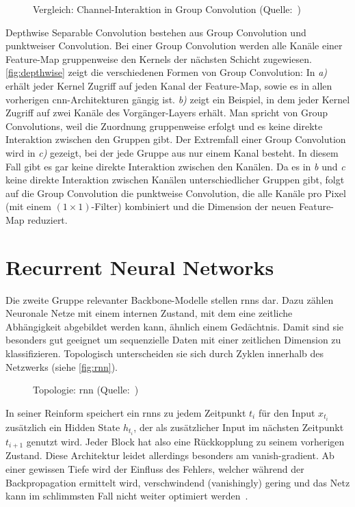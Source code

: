\begin{figure}[h!]
    \centering
    \caption{Vergleich: Channel-Interaktion in Group Convolution (Quelle:~\cite{Tran19})}
    \label{fig:depthwise}
\end{figure}

Depthwise Separable Convolution bestehen aus Group Convolution und punktweiser Convolution.
Bei einer Group Convolution werden alle Kanäle einer Feature-Map gruppenweise den Kernels der nächsten Schicht zugewiesen.
\autoref{fig:depthwise} zeigt die verschiedenen Formen von Group Convolution:
In \emph{a)} erhält jeder Kernel Zugriff auf jeden Kanal der Feature-Map, sowie es in allen vorherigen \gls{cnn}-Architekturen gängig ist.
\emph{b)} zeigt ein Beispiel, in dem jeder Kernel Zugriff auf zwei Kanäle des Vorgänger-Layers erhält.
Man spricht von Group Convolutions, weil die Zuordnung gruppenweise erfolgt und es keine direkte Interaktion zwischen den Gruppen gibt.
Der Extremfall einer Group Convolution wird in \emph{c)} gezeigt, bei der jede Gruppe aus nur einem Kanal besteht.
In diesem Fall gibt es gar keine direkte Interaktion zwischen den Kanälen.
Da es in \emph{b} und \emph{c} keine direkte Interaktion zwischen Kanälen unterschiedlicher Gruppen gibt, folgt auf die Group Convolution die punktweise Convolution, die alle Kanäle pro Pixel (mit einem $(1 \times 1)$-Filter) kombiniert und die Dimension der neuen Feature-Map reduziert.

\section{Recurrent Neural Networks}
\label{subsec:recurrent-neural-networks}

Die zweite Gruppe relevanter Backbone-Modelle stellen \glspl{rnn} dar.
Dazu zählen Neuronale Netze mit einem internen Zustand, mit dem eine zeitliche Abhängigkeit abgebildet werden kann, ähnlich einem Gedächtnis.
Damit sind sie besonders gut geeignet um sequenzielle Daten mit einer zeitlichen Dimension zu klassifizieren.
Topologisch unterscheiden sie sich durch Zyklen innerhalb des Netzwerks (siehe \autoref{fig:rnn}).

\begin{figure}[h!]
    \centering
    \caption{Topologie: \gls{rnn} (Quelle:~\cite{Veen17})}
    \label{fig:rnn}
\end{figure}

In seiner Reinform speichert ein \glspl{rnn} zu jedem Zeitpunkt $t_i$ für den Input $x_{t_i}$ zusätzlich ein Hidden State $h_{t_i}$, der als zusätzlicher Input im nächsten Zeitpunkt $t_{i+1}$ genutzt wird.
Jeder Block hat also eine Rückkopplung zu seinem vorherigen Zustand.
Diese Architektur leidet allerdings besonders am \gls{vanish-gradient}.
Ab einer gewissen Tiefe wird der Einfluss des Fehlers, welcher während der Backpropagation ermittelt wird, verschwindend (vanishingly) gering und das Netz kann im schlimmsten Fall nicht weiter optimiert werden~\cite{Pointer19}.

